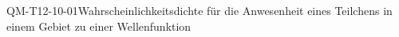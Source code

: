 
\begin{DEF}{QM-T12-10-01}{Wahrscheinlichkeitsdichte für die Anwesenheit eines Teilchens in einem Gebiet zu einer Wellenfunktion}
\end{DEF}
